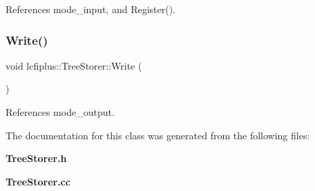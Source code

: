 References mode\+\_\+input, and Register().

\mbox{\label{classlcfiplus_1_1TreeStorer_a0815db3d1ea7548b4506118b08d531d3}} 
\subsubsection{Write()}
{\footnotesize\ttfamily void lcfiplus\+::\+Tree\+Storer\+::\+Write (\begin{DoxyParamCaption}{ }\end{DoxyParamCaption})}



References mode\+\_\+output.



The documentation for this class was generated from the following files\+:\begin{DoxyCompactItemize}
\item 
\textbf{ Tree\+Storer.\+h}\item 
\textbf{ Tree\+Storer.\+cc}\end{DoxyCompactItemize}
